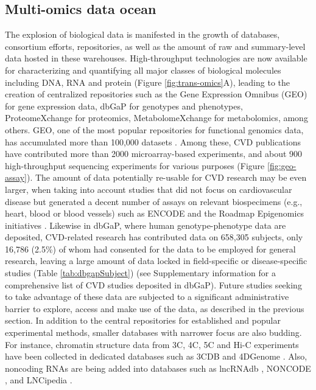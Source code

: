 \documentclass[letter]{bioinfo}
\begin{document}
	\subsection*{Multi-omics data ocean}
    The explosion of biological data is manifested in the growth of databases, consortium efforts, repositories, as well as the amount of raw and summary-level data hosted in these warehouses. High-throughput technologies are now available for characterizing and quantifying all major classes of biological molecules including DNA, RNA and protein (Figure \ref{fig:trans-omics}A), leading to the creation of centralized repositories such as the Gene Expression Omnibus (GEO) \citep{Barrett:2013:NCBI} for gene expression data, dbGaP \citep{Tryka:2014:dbGaP} for genotypes and phenotypes, ProteomeXchange \citep{Vizcaino:2014:ProteomeXchange,Deutsch:2017:ProteomeXchange} for proteomics, MetabolomeXchange for metabolomics, among others.  GEO, one of the most popular repositories for functional genomics data, has accumulated more than 100,000 datasets \citep{Zhu:2008:GEOmetadb}. Among these, CVD publications have contributed more than 2000 microarray-based experiments, and about 900 high-throughput sequencing experiments for various purposes (Figure \ref{fig:geo-assay}). The amount of data potentially re-usable for CVD research may be even larger, when taking into account studies that did not focus on cardiovascular disease but generated a decent number of assays on relevant biospecimens (e.g., heart, blood or blood vessels) such as ENCODE \citep{ENCODE:2012:integrated} and the Roadmap Epigenomics initiatives \citep{Roadmap:2015:Integrative}.
	Likewise in dbGaP, where human genotype-phenotype data are deposited, CVD-related research has contributed data on 658,305 subjects, only 16,786 (2.5\%) of whom had consented for the data to be employed for general research, leaving a large amount of data locked in field-specific or disease-specific studies (Table \ref{tab:dbgapSubject}) (see Supplementary information for a comprehensive list of CVD studies deposited in dbGaP). Future studies seeking to take advantage of these data are subjected to a significant administrative barrier to explore, access and make use of the data, as described in the previous section.
	In addition to the central repositories for established and popular experimental methods, smaller databases with narrower focus are also budding. For instance, chromatin structure data from 3C, 4C, 5C and Hi-C experiments have been collected in dedicated databases such as 3CDB \citep{Yun:2016:3CDB} and 4DGenome \citep{Teng:2015:4DGenome}. Also, noncoding RNAs are being added into databases such as lncRNAdb \citep{Quek:2015:lncRNAdb}, NONCODE \citep{Fang:2018:NONCODEV5}, and LNCipedia \citep{Volders:2018:LNCipedia}.
	
\end{document}
